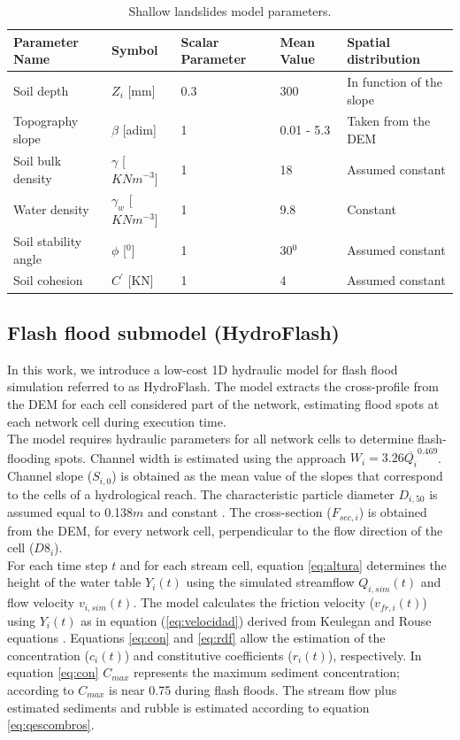 \documentclass[hess, manuscript]{copernicus}
\begin{document}
\begin{table}[]
        \centering
        \begin{tabularx}{\textwidth}{p{3cm} p{2.2cm} p{1.5cm} p{2cm} p{3.5cm}}
\hline
Parameter Name & Symbol & Scalar Parameter & Mean Value & Spatial distribution \\
\hline
Soil depth & $Z_i$ [mm] & 0.3 & 300 & In function of the slope \\
Topography slope & $\beta$ [adim] & 1 & 0.01 - 5.3 & Taken from the DEM \\
Soil bulk density & $\gamma$ [$KNm^{-3}$] & 1  & 18  & Assumed constant\\
Water density & $\gamma_w$ [$KNm^{-3}$] & 1 & 9.8 & Constant\\
Soil stability angle & $\phi$ [$^0$] & 1 & 30$^0$ & Assumed constant\\
Soil cohesion & $C^{'}$ [KN] & 1 & 4 & Assumed constant\\
\hline
\end{tabularx}
\caption{Shallow landslides model parameters.}
\label{tab:landslide}
\end{table}

\subsection{Flash flood submodel (HydroFlash)}

In this work, we introduce a low-cost 1D hydraulic model for flash flood simulation referred to as HydroFlash. The model extracts the cross-profile from the DEM  for each cell considered part of the network,  estimating flood spots at each network cell during execution time.\\

The model requires hydraulic parameters for all network cells to determine flash-flooding spots.  Channel width is estimated using the \cite{Leopold1953} approach $ W_i = 3.26 \overline{Q_i}^{0.469}$.  Channel slope ($S_{i,0}$) is obtained as the mean value of the slopes that correspond to the cells of a hydrological reach. The  characteristic particle diameter $D_{i,50}$ is assumed equal to 0.138$m$ and constant \citep{Golden2006}.  The cross-section ($F_{sec,i}$) is obtained from the DEM, for every network cell,  perpendicular to the flow direction of the cell ($D8_{i}$).\\

For each time step $t$ and for each stream cell, equation \ref{eq:altura} determines the height of the water table $Y_{i}(t)$ using the simulated streamflow $Q_{i,sim}(t)$ and flow velocity $v_{i,sim}(t)$. The model calculates the friction velocity ($v_{fr,i}(t)$) using $Y_i(t)$ as in equation (\ref{eq:velocidad}) derived from Keulegan and Rouse equations \citep{takahashi1991, Savage1984}. Equations \ref{eq:con} and \ref{eq:rdf} allow the estimation of the concentration ($c_{i}(t)$) and constitutive coefficients ($r_{i}(t)$), respectively.  In equation \ref{eq:con} $C_{max}$ represents the maximum sediment concentration;  according to \citet{Obrien1988} $C_{max}$ is near 0.75 during flash floods. The stream flow plus estimated sediments and rubble is estimated according to equation \ref{eq:qescombros}.
\end{document}
